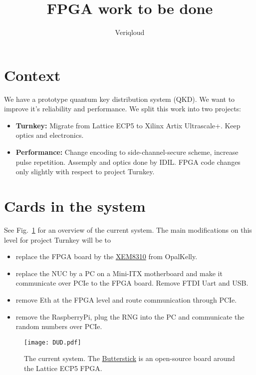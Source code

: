 \documentclass[10pt]{article}
\begin{document}
\title{FPGA work to be done}

\author{Veriqloud}

\date{}
\maketitle




\section{Context}
We have a prototype quantum key distribution system (QKD). We want to improve it's reliability and performance. 
We split this work into two projects: 
\begin{itemize}
    \item \textbf{Turnkey:} Migrate from Lattice ECP5 to Xilinx Artix Ultrascale+. 
        Keep optics and electronics.
    \item \textbf{Performance:} Change encoding to side-channel-secure scheme, increase pulse repetition. 
        Assemply and optics done by IDIL.\@ 
        FPGA code changes only slightly with respect to project Turnkey.
\end{itemize}


\section{Cards in the system}
See Fig.~\ref{fig:current_system} for an overview of the current system. The main modifications on this level for project Turnkey will be to
\begin{itemize}
    \item replace the FPGA board by the \href{https://opalkelly.com/products/xem8310/}{XEM8310} from OpalKelly.
    \item replace the NUC by a PC on a Mini-ITX motherboard and make it communicate over PCIe to the FPGA board. Remove FTDI Uart and USB.\@
    \item remove Eth at the FPGA level and route communication through PCIe.
    \item remove the RaspberryPi, plug the RNG into the PC and communicate the random numbers over PCIe.
\end{itemize}

\begin{figure}[!h]
    \centering
    \texttt{[image: DUD.pdf]}
    \caption{The current system. The \href{https://github.com/butterstick-fpga/butterstick-hardware}{Butterstick} is an open-source board around the Lattice ECP5 FPGA.}%
    \label{fig:current_system}
\end{figure}
\end{document}

